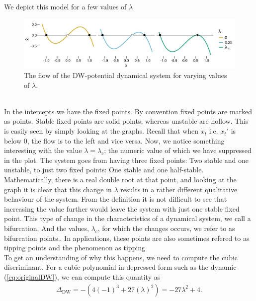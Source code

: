 We depict this model for a few values of $\lambda$
\begin{figure}[h]
    \begin{center}
        \includegraphics[scale = .5]{figures/double_well_plot.jpeg}
        \caption{The flow of the DW-potential dynamical system for varying values of $\lambda$.}
        \label{figure:DW_dynamic_plot}
    \end{center}
\end{figure}\\
In the intercepts we have the fixed points. By convention fixed points are marked as points. Stable fixed points are solid points, whereas unstable are hollow. This is easily seen by simply looking at the graphs. Recall that when $\dot{x}_t$ i.e. $x_t'$ is below 0, the flow is to the left and vice versa. Now, we notice something interesting with the value $\lambda = \lambda_c$; the numeric value of which we have suppressed in the plot. The system goes from having three fixed points: Two stable and one unstable, to just two fixed points: One stable and one half-stable. Mathematically, there is a real double root at that point, and looking at the graph it is clear that this change in $\lambda$ results in a rather different qualitative behaviour of the system. From the definition it is not difficult to see that increasing the value further would leave the system with just one stable fixed point. This type of change in the characteristics of a dynamical system, we call a bifurcation. And the values, $\lambda_c$, for which the changes occurs, we refer to as bifurcation points.\cite{Strogatz2019_gv}. In applications, these points are also sometimes refered to as tipping points and the phenomenon as tipping\\
To get an understanding of why this happens, we need to compute the cubic discriminant. For a cubic polynomial in depressed form such as the dynamic (\ref{eq:originalDW}), we can compute this quantity as
\begin{align}
    \Delta_{\mathrm{DW}} = -\left(4(-1)^3+27\left(\lambda\right)^2\right) = -27\lambda^2 + 4. \label{eq:DW_discriminant}
\end{align} 
